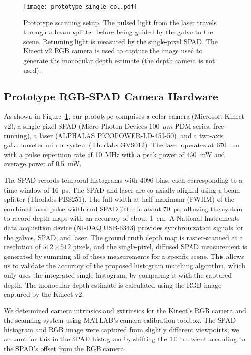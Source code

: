 \begin{figure}[t!]
	\centering
  \texttt{[image: prototype\_single\_col.pdf]}
  \caption{Prototype scanning setup. The pulsed light from the laser travels
    through a beam splitter before being guided by the galvo to the scene.
    Returning light is measured by the single-pixel SPAD. The Kinect v2 RGB 
    camera is used to capture the image used to generate the monocular depth estimate
    (the depth camera is not used).}
  \label{fig:prototype}
\end{figure}

\subsection{Prototype RGB-SPAD Camera Hardware}


As shown in Figure~\ref{fig:prototype}, our prototype comprises a color camera (Microsoft Kinect v2), a single-pixel SPAD (Micro Photon Devices 100~$\mu m$ PDM series, free-running), a laser (ALPHALAS PICOPOWER-LD-450-50), and a two-axis galvanometer mirror system (Thorlabs GVS012). The laser operates at 670~nm with a pulse repetition rate of 10~MHz with a peak power of 450~mW and average power of 0.5~mW. 

The SPAD records temporal histograms with 4096 bins, each corresponding to a time window of 16~ps. The SPAD and laser are co-axially aligned using a beam splitter (Thorlabs PBS251). The full width at half maximum (FWHM) of the combined laser pulse width and SPAD jitter is about 70~ps, allowing the system to record depth maps with an accuracy of about 1~cm. A National Instruments data acquisition device (NI-DAQ USB-6343) provides synchronization signals for the galvos, SPAD, and laser. The ground truth depth map is raster-scanned at a resolution of $512 \times 512$ pixels, and the single-pixel, diffused SPAD measurement is generated by summing all of these measurements for a specific scene. This allows us to validate the accuracy of the proposed histogram matching algorithm, which only uses the integrated single histogram, by comparing it with the captured depth. The monocular depth estimate is calculated using the RGB image captured by the Kinect v2.

We determined camera intrinsics and extrinsics for the Kinect's RGB camera and
the scanning system using MATLAB's camera calibration toolbox. 
The SPAD histogram and RGB image were captured from slightly different viewpoints; we account for this in the SPAD histogram by shifting the 1D transient according to the SPAD's offset from the RGB camera. 

